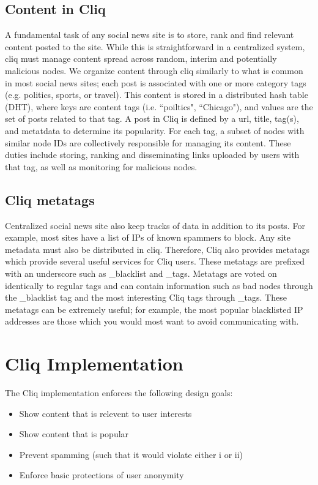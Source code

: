 \documentclass{sig-alternate}
\begin{document}
\subsection{Content in Cliq}
A fundamental task of any social news site is to store, rank and find relevant content posted to the site. While this is straightforward in a centralized system, cliq must manage content spread across random, interim and potentially malicious nodes.
We organize content through cliq similarly to what is common in most social news sites; each 
post is associated with one or more category tags (e.g. politics, sports, or travel). 
This content is stored in a distributed hash table (DHT), where keys are content tags (i.e. ``poiltics", ``Chicago"), and values are the set of posts related to that tag. A post in Cliq is defined by a url, title, tag(s), and metatdata to determine its popularity. For each tag, a subset of nodes with similar node IDs are collectively responsible for managing its content. These duties include storing, ranking and disseminating links uploaded by users with that tag, as well as monitoring for malicious nodes.

\subsection{Cliq metatags}

Centralized social news site also keep tracks of data in addition to its posts. For example, most sites have a list of IPs of known spammers to block. Any site metadata must also be distributed in cliq. Therefore, Cliq also provides metatags which provide several useful services for Cliq users. These metatags are prefixed with an underscore such as \_blacklist and \_tags. 
Metatags are voted on identically to regular tags and can contain information such as bad nodes through the \_blacklist tag and the most interesting Cliq tags through \_tags. 
These metatags can be extremely useful; for example, the most popular blacklisted IP addresses are those which you would most want to avoid communicating with. 

\section{Cliq Implementation}

The Cliq implementation enforces the following design goals: 

\begin{itemize}
\item Show content that is relevent to user interests
\item Show content that is popular
\item Prevent spamming (such that it would violate either i or ii)
\item Enforce basic protections of user anonymity
\end{itemize}
\end{document}
